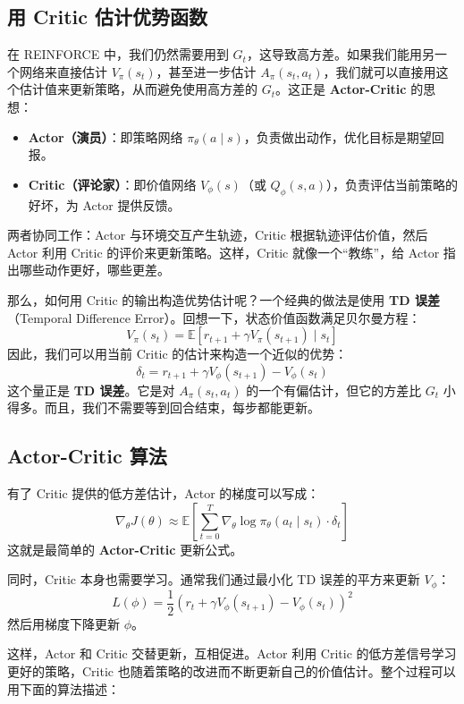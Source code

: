 \documentclass[lang=cn,zihao=-4,a4paper,fontset=windows]{beautybook}
\begin{document}
\subsection{用 Critic 估计优势函数}

在 REINFORCE 中，我们仍然需要用到 \(G_t\)，这导致高方差。如果我们能用另一个网络来直接估计 \(V_\pi(s_t)\)，甚至进一步估计 \(A_\pi(s_t, a_t)\)，我们就可以直接用这个估计值来更新策略，从而避免使用高方差的 \(G_t\)。这正是 \textbf{Actor-Critic} 的思想：

\begin{itemize}
    \item \textbf{Actor（演员）}：即策略网络 \(\pi_\theta(a \mid s)\)，负责做出动作，优化目标是期望回报。
    \item \textbf{Critic（评论家）}：即价值网络 \(V_\phi(s)\)（或 \(Q_\phi(s,a)\)），负责评估当前策略的好坏，为 Actor 提供反馈。
\end{itemize}

两者协同工作：Actor 与环境交互产生轨迹，Critic 根据轨迹评估价值，然后 Actor 利用 Critic 的评价来更新策略。这样，Critic 就像一个“教练”，给 Actor 指出哪些动作更好，哪些更差。

那么，如何用 Critic 的输出构造优势估计呢？一个经典的做法是使用 \textbf{TD 误差}（Temporal Difference Error）。回想一下，状态价值函数满足贝尔曼方程：
\[
V_\pi(s_t) = \mathbb{E}[r_{t+1} + \gamma V_\pi(s_{t+1}) \mid s_t]
\]
因此，我们可以用当前 Critic 的估计来构造一个近似的优势：
\[
\delta_t = r_{t+1} + \gamma V_\phi(s_{t+1}) - V_\phi(s_t)
\]
这个量正是 \textbf{TD 误差}。它是对 \(A_\pi(s_t, a_t)\) 的一个有偏估计，但它的方差比 \(G_t\) 小得多。而且，我们不需要等到回合结束，每步都能更新。

\subsection{Actor-Critic 算法}

有了 Critic 提供的低方差估计，Actor 的梯度可以写成：
\[
\nabla_\theta J(\theta) \approx \mathbb{E}\left[ \sum_{t=0}^T \nabla_\theta \log \pi_\theta(a_t \mid s_t) \cdot \delta_t \right]
\]
这就是最简单的 \textbf{Actor-Critic} 更新公式。

同时，Critic 本身也需要学习。通常我们通过最小化 TD 误差的平方来更新 \(V_\phi\)：
\[
L(\phi) = \frac{1}{2} \left( r_t + \gamma V_\phi(s_{t+1}) - V_\phi(s_t) \right)^2
\]
然后用梯度下降更新 \(\phi\)。

这样，Actor 和 Critic 交替更新，互相促进。Actor 利用 Critic 的低方差信号学习更好的策略，Critic 也随着策略的改进而不断更新自己的价值估计。整个过程可以用下面的算法描述：
\end{document}
